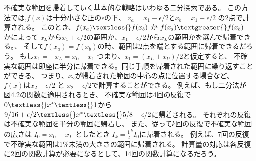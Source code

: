 不確実な範囲を帰着していく基本的な戦略はいわゆる二分探索である。
この方法では,$f(x)$は十分小さな正の$\epsilon$の下、
$x_a = x_1 - \epsilon / 2$と$x_b = x_1 +
\epsilon / 2$ の2点で計算される。 このとき、$ f(x_a)
\textless{} f(x_b) $ か $ f(x_a) \textgreater{} f(x_b) $
かによって $x_L$から$x_1 + \epsilon /2
$の範囲か、$x_1 - \epsilon /2
$から$x_L$の範囲かを選んで帰着できる。、 そして$f(x_a) =
f(x_b)$の時、範囲は2点を端とする範囲に帰着できるだろう。 もし$ x_1
=- x_L = x_U - x_1 $ つまり、$ x_1 = (x_L + x_U)/2
$と仮定すると、
不確実な範囲は即座に半分に帰着できる。同じ手順を帰着された範囲に繰り返すことができる、
つまり、$x_2$が帰着された範囲の中心の点に位置する場合など、
$f(x)$は$x_2 - \epsilon / 2$ と $x_2 +
\epsilon / 2$で計算することができる。
例えば、もし二分法が図4.2の関数に適用されるとき、
不確実な範囲は4回の反復で$0 \textless{} x^{*} \textless{}
1$から$9/16 + \epsilon / 2 \textless{} x^{*}
\textless{} 5/8 - \epsilon / 2$に帰着される。
それぞれの反復は不確実な範囲を半分の範囲に帰着し、
また、従って$k$回の反復で不確実な範囲の広さは $I_0 = x_U - x_L $
としたとき $I_k =
\frac{1}{2}^kI_0$に帰着される。
例えば、7回の反復で不確実な範囲は1\%未満の大きさの範囲に帰着される。
計算量の対応は各反復に2回の関数計算が必要になるとして、14回の関数計算になるだろう。
